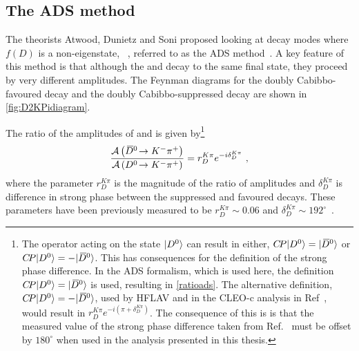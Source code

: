 \subsection{The ADS method}
\label{sec:theory:ads}

The theorists Atwood, Dunietz and Soni proposed looking at \D decay modes where $f(D)$ is a non-\CP eigenstate, \eg~\decay{\D}{\Km\pip}, referred to as the ADS method~\cite{ADS,ADS-2001}. A key feature of this method is that although the \Dz and \Dzb decay to the same final state, they proceed by very different amplitudes. The Feynman diagrams for the doubly Cabibbo-favoured \decay{\Dz}{\Km\pip} decay and the doubly Cabibbo-suppressed \decay{\Dz}{\Kp\pim} decay are shown in \fig\ref{fig:D2KPidiagram}.


The ratio of the amplitudes of \decay{\Dzb}{\Km\pip} and \decay{\Dz}{\Km\pip} is given by\footnote{The \CP operator acting on the state $|{{D}^0}\rangle$ can result in either, ${C\!P}|{{D}^0}\rangle = |{{\kern 0.2em\overline{\kern -0.2em D}{}}{}^0}\rangle$ or ${C\!P}|{{D}^0}\rangle = - |{{\kern 0.2em\overline{\kern -0.2em D}{}}{}^0}\rangle$. This has consequences for the definition of the strong phase difference. In the ADS formalism, which is used here, the definition ${C\!P}|{{D}^0}\rangle = |{{\kern 0.2em\overline{\kern -0.2em D}{}}{}^0}\rangle$ is used, resulting in \eqn\ref{ratioads}. The alternative definition, ${C\!P}|{{D}^0}\rangle = - |{{\kern 0.2em\overline{\kern -0.2em D}{}}{}^0}\rangle$, used by HFLAV and in the CLEO-c analysis in Ref~\cite{charmkpi_deltab}, would result in $r_D^{K\pi}e^{-i(\pi + \delta_D^{K\pi})}$. The consequence of this is is that the measured value of the strong phase difference taken from Ref.~\cite{charmkpi_deltab} must be offset by $180^{\circ}$ when used in the analysis presented in this thesis.}
\begin{equation}
\frac{\mathcal{A}\left({{\kern 0.2em\overline{\kern -0.2em D}{}}{}^0}\!\rightarrow {\ensuremath{{K}^-}}{\ensuremath{{\pi}^+}}\right)}{\mathcal{A}\left({{D}^0}\!\rightarrow {\ensuremath{{K}^-}}{\ensuremath{{\pi}^+}}\right)} = r_D^{K\pi}e^{-i\delta_D^{K\pi}} \text { ,}
\label{ratioads}
\end{equation}
where the parameter $r_D^{K\pi}$ is the magnitude of the ratio of amplitudes and $\delta_D^{K\pi}$ is difference in strong phase between the suppressed and favoured decays. These parameters have been previously measured to be $r_D^{K\pi} \sim 0.06$ and $\delta_D^{K\pi} \sim 192^{\circ}$~\cite{HFAG}.


